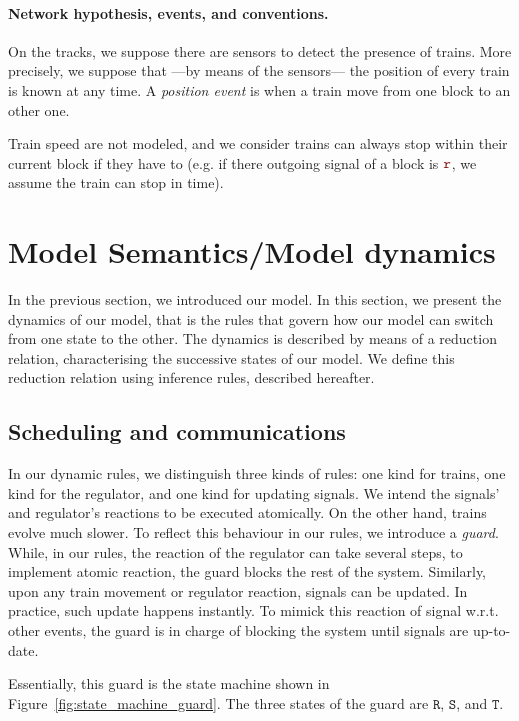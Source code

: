 \documentclass[runningheads]{llncs}
\newcommand{\sigred}{{\mbox{${\color{red!50!black}\mathtt{r}}$}}\xspace}
\newcommand{\guardFmt}[1]{{\color{guardcolor} \ensuremath{\mathtt{#1}}}}
\newcommand{\guardT}{\guardFmt{T}}
\newcommand{\guardS}{\guardFmt{S}}
\newcommand{\guardR}{\guardFmt{R}}
\begin{document}
\paragraph{Network hypothesis, events, and conventions.}
On the tracks, we suppose there are sensors to detect the presence of trains. More precisely, we suppose that ---by means of the sensors--- the position of every train is known at any time. A \emph{position event} is when a train move from one block to an other one. 

Train speed are not modeled, and we consider trains can always stop within their current block if they have to (e.g. if there outgoing signal of a block is \sigred, we assume the train can stop in time).


\section{Model Semantics/Model dynamics}
\label{sec:formal-model}

In the previous section, we introduced our model. In this section, we present the dynamics of our model, that is the rules that govern how our model can switch from one state to the other. The dynamics is described by means of a reduction relation, characterising the successive states of our model. We define this reduction relation using inference rules, described hereafter.


\subsection{Scheduling and communications}

In our dynamic rules, we distinguish three kinds of rules: one kind for trains, one kind for the regulator, and one kind for updating signals. We intend the signals' and regulator's reactions to be executed atomically. On the other hand, trains evolve much slower. To reflect this behaviour in our rules, we introduce a \emph{guard}. While, in our rules, the reaction of the regulator can take several steps, to implement atomic reaction, the guard blocks the rest of the system. Similarly, upon any train movement or regulator reaction, signals can be updated. In practice, such update happens instantly. To mimick this reaction of signal w.r.t. other events, the guard is in charge of blocking the system until signals are up-to-date.

Essentially, this guard is the state machine shown in Figure~\ref{fig:state_machine_guard}. The three states of the guard are \guardR, \guardS, and \guardT.
\end{document}
